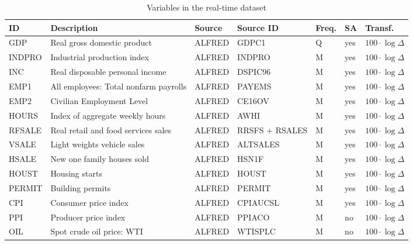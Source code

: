 \begin{sidewaystable}[!htb]
	\label{tbl:dataset}
	\caption{Variables in the real-time dataset}
	\small
	\begin{tabular}{|l|l|l|l|l|l|l|}
		\hline
		ID     & Description                           & Source & Source ID & Freq. & SA & Transf. \\ %
		\hline
		GDP    & Real gross domestic product           & ALFRED & GDPC1     & Q         & yes & $100\cdot\log \Delta$  \\
		INDPRO & Industrial production index            & ALFRED & INDPRO    & M         & yes & $100\cdot\log \Delta$  \\
		INC    & Real disposable personal income       & ALFRED & DSPIC96   & M         & yes & $100\cdot\log \Delta$  \\
		EMP1   & All employees: Total nonfarm payrolls & ALFRED & PAYEMS    & M         & yes & $100\cdot\log \Delta$  \\
		EMP2   & Civilian Employment Level             & ALFRED & CE16OV    & M         & yes & $100\cdot\log \Delta$  \\
		HOURS  & Index of aggregate weekly hours       & ALFRED & AWHI      & M         & yes & $100\cdot\log \Delta$  \\
		RFSALE & Real retail and food services sales   & ALFRED & RRSFS + RSALES & M    & yes & $100\cdot\log \Delta$  \\
		VSALE  & Light weights vehicle sales     	   & ALFRED & ALTSALES  & M         & yes & $100\cdot\log \Delta$  \\
		HSALE  & New one family houses sold            & ALFRED & HSN1F     & M         & yes & $100\cdot\log \Delta$  \\
		HOUST  & Housing starts                        & ALFRED & HOUST     & M         & yes & $100\cdot\log \Delta$  \\
		PERMIT & Building permits                      & ALFRED & PERMIT    & M         & yes & $100\cdot\log \Delta$  \\
		CPI    & Consumer price index                  & ALFRED & CPIAUCSL  & M         & yes & $100\cdot\log \Delta$  \\
		PPI    & Producer price index                  & ALFRED & PPIACO    & M         & no  & $100\cdot\log \Delta$  \\
		OIL    & Spot crude oil price: WTI             & ALFRED & WTISPLC  & M          & no & $100\cdot\log \Delta$ \\

\end{tabular}
\end{sidewaystable}
